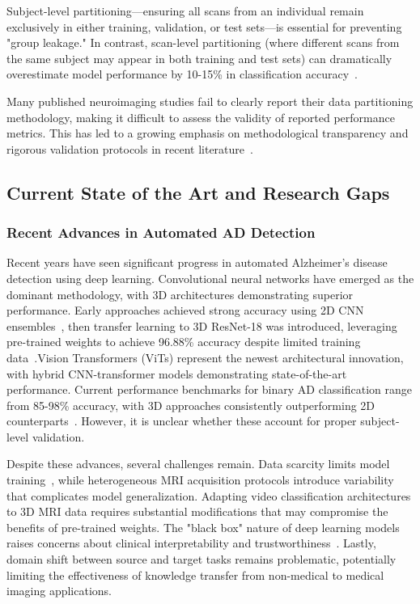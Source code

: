 \documentclass[11pt, a4paper]{article}
\begin{document}
Subject-level partitioning—ensuring all scans from an individual remain exclusively in either training, validation, or test sets—is essential for preventing "group leakage." In contrast, scan-level partitioning (where different scans from the same subject may appear in both training and test sets) can dramatically overestimate model performance by 10-15\% in classification accuracy~\cite{davatzikos2019machine}.

Many published neuroimaging studies fail to clearly report their data partitioning methodology, making it difficult to assess the validity of reported performance metrics. This has led to a growing emphasis on methodological transparency and rigorous validation protocols in recent literature~\cite{davatzikos2019machine}.

\subsection{Current State of the Art and Research Gaps}

\subsubsection{Recent Advances in Automated AD Detection}

Recent years have seen significant progress in automated Alzheimer's disease detection using deep learning. Convolutional neural networks have emerged as the dominant methodology, with 3D architectures demonstrating superior performance. Early approaches achieved strong accuracy using 2D CNN ensembles~\cite{farooq2017deep}, then transfer learning to 3D ResNet-18 was introduced, leveraging pre-trained weights to achieve 96.88\% accuracy despite limited training data~\cite{ebrahimi2020introducing}.Vision Transformers (ViTs) represent the newest architectural innovation, with hybrid CNN-transformer models demonstrating state-of-the-art performance. Current performance benchmarks for binary AD classification range from 85-98\% accuracy, with 3D approaches consistently outperforming 2D counterparts~\cite{saikia2024alzheimer,mubonanyikuzo2025detection}. However, it is unclear whether these account for proper subject-level validation.

Despite these advances, several challenges remain. Data scarcity limits model training~\cite{pradhan2024analysis}, while heterogeneous MRI acquisition protocols introduce variability that complicates model generalization. Adapting video classification architectures to 3D MRI data requires substantial modifications that may compromise the benefits of pre-trained weights. The "black box" nature of deep learning models raises concerns about clinical interpretability and trustworthiness~\cite{basaia2019automated}. Lastly, domain shift between source and target tasks remains problematic, potentially limiting the effectiveness of knowledge transfer from non-medical to medical imaging applications.
\end{document}
